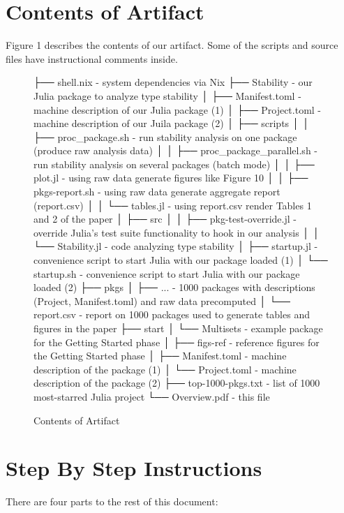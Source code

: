 \documentclass[
]{article}
\begin{document}
\section{Contents of Artifact}

Figure 1 describes the contents of our artifact. Some of the scripts and source files
have instructional comments inside.

\begin{figure}[ht]
\label{fig:contents}
\begin{verbnobox}[\small]
├── shell.nix - system dependencies via Nix
├── Stability - our Julia package to analyze type stability
│  ├── Manifest.toml - machine description of our Julia package (1)
│  ├── Project.toml  - machine description of our Juila package (2)
│  ├── scripts
│  │  ├── proc_package.sh - run stability analysis on one package (produce raw analysis data)
│  │  ├── proc_package_parallel.sh - run stability analysis on several packages (batch mode)
│  │  ├── plot.jl - using raw data generate figures like Figure 10
│  │  ├── pkgs-report.sh - using raw data generate aggregate report (report.csv)
│  │  └── tables.jl - using report.csv render Tables 1 and 2 of the paper
│  ├── src
│  │  ├── pkg-test-override.jl - override Julia's test suite functionality to hook in our analysis
│  │  └── Stability.jl - code analyzing type stability
│  ├── startup.jl - convenience script to start Julia with our package loaded (1)
│  └── startup.sh - convenience script to start Julia with our package loaded (2)
├── pkgs
│  ├── ... - 1000 packages with descriptions ({Project, Manifest}.toml) and raw data precomputed
│  └── report.csv - report on 1000 packages used to generate tables and figures in the paper
├── start
│  └── Multisets - example package for the Getting Started phase
│     ├── figs-ref - reference figures for the Getting Started phase
│     ├── Manifest.toml - machine description of the package (1)
│     └── Project.toml - machine description of the package (2)
├── top-1000-pkgs.txt - list of 1000 most-starred Julia project
└── Overview.pdf - this file
\end{verbnobox}
\caption{Contents of Artifact}
\end{figure}

\hypertarget{step-by-step-instructions}{%
\section{Step By Step Instructions}\label{step-by-step-instructions}}

There are four parts to the rest of this document:
\end{document}
